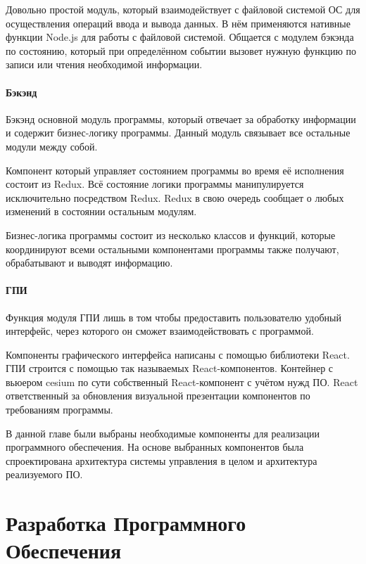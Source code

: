 \documentclass[specification,annotation]{itmo-student-thesis}
\begin{document}
Довольно простой модуль, который взаимодействует с файловой системой ОС для
осуществления операций ввода и вывода данных. В нём применяются нативные функции
Node.js для работы с файловой системой. Общается с модулем бэкэнда по состоянию,
который при определённом событии вызовет нужную функцию по записи или чтения
необходимой информации.

\subsubsection{Бэкэнд}\label{subsubsec:backend}

Бэкэнд основной модуль программы, который отвечает за обработку информации и
содержит бизнес-логику программы. Данный модуль связывает все остальные модули
между собой.

Компонент который управляет состоянием программы во время её исполнения состоит
из Redux. Всё состояние логики программы манипулируется исключительно
посредством Redux. Redux в свою очередь сообщает о любых изменений в состоянии
остальным модулям.

Бизнес-логика программы состоит из несколько классов и функций, которые
координируют всеми остальными компонентами программы также получают,
обрабатывают и выводят информацию.

\subsubsection{ГПИ}\label{subsubsec:gui}

Функция модуля ГПИ лишь в том чтобы предоставить пользователю удобный интерфейс,
через которого он сможет взаимодействовать с программой.

Компоненты графического интерфейса написаны с помощью библиотеки React. ГПИ
строится с помощью так называемых React-компонентов. Контейнер с вьюером cesium
по сути собственный React-компонент с учётом нужд ПО. React ответственный за
обновления визуальной презентации компонентов по требованиям программы.

\newpage

\chapterconclusion

В данной главе были выбраны необходимые компоненты для реализации программного
обеспечения. На основе выбранных компонентов была спроектирована архитектура
системы управления в целом и архитектура реализуемого ПО.

\chapter{Разработка Программного Обеспечения}\label{ch:devprog}
\end{document}
